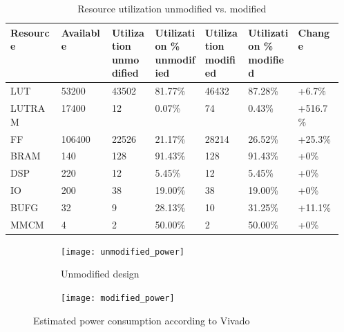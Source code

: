 \documentclass[../bachelor_paper.tex]{subfiles}
\begin{document}
\begin{table}
    \centering
    \begin{tabular}{llp{0.13\linewidth}p{0.15\linewidth}p{0.13\linewidth}p{0.15\linewidth}l}
    \textbf{Resource}   & \textbf{Available}    & \textbf{Utilization unmodified} & \textbf{Utilization \% unmodified}  & \textbf{Utilization modified}   & \textbf{Utilization \% modified}    & \textbf{Change}\\
    \hline
    \acs{LUT}           & 53200                 & 43502                     & 81.77\%                       & 46432                     & 87.28\%   & +6.7\%\\
    \acs{LUTRAM}        & 17400                 & 12                        & 0.07\%                        & 74                        & 0.43\%    & +516.7\%\\
    \acs{FF}            & 106400                & 22526                     & 21.17\%                       & 28214                     & 26.52\%   & +25.3\%\\
    \acs{BRAM}          & 140                   & 128                       & 91.43\%                       & 128                       & 91.43\%   & +0\%\\
    \acs{DSP}           & 220                   & 12                        & 5.45\%                        & 12                        & 5.45\%    & +0\%\\
    \acs{IO}            & 200                   & 38                        & 19.00\%                       & 38                        & 19.00\%   & +0\%\\
    \acs{BUFG}          & 32                    & 9                         & 28.13\%                       & 10                        & 31.25\%   & +11.1\%\\
    \acs{MMCM}          & 4                     & 2                         & 50.00\%                       & 2                         & 50.00\%   & +0\%\\
    \hline
    \end{tabular}
    \caption{Resource utilization unmodified vs. modified}
    \label{tab:perf/util/data}
\end{table}

\begin{figure}
    \centering
    \begin{subfigure}{0.45\textwidth}
        \texttt{[image: unmodified\_power]}
        \caption{Unmodified design}
        \label{fig:perf/power/split/unmod}
    \end{subfigure}
    \hfil
    \begin{subfigure}{0.45\textwidth}
        \texttt{[image: modified\_power]}
        \label{fig:perf/power/split/mod}
    \end{subfigure}
    \caption{Estimated power consumption according to Vivado}
    \label{fig:perf/power/split}
\end{figure}

\isstandalone



\fi
\end{document}
